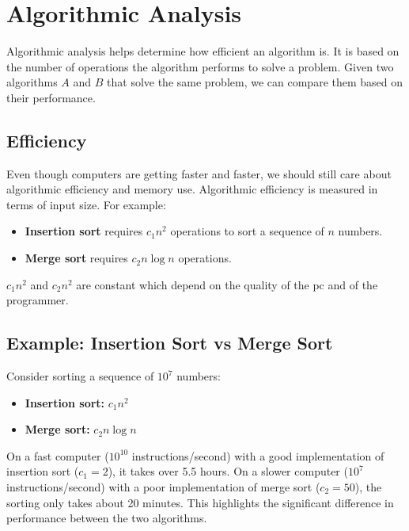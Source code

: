     \section{Algorithmic Analysis}
    Algorithmic analysis helps determine how efficient an algorithm is. It is based on the number of operations the algorithm performs to solve a problem. Given two algorithms \(A\) and \(B\) that solve the same problem, we can compare them based on their performance.
    
    \subsection{Efficiency}
    Even though computers are getting faster and faster, we should still care about algorithmic efficiency and memory use. Algorithmic efficiency is measured in terms of input size. For example:
    \begin{itemize}
        \item \textbf{Insertion sort} requires \(c_1 n^2\) operations to sort a sequence of \(n\) numbers.
        \item \textbf{Merge sort} requires \(c_2 n \log n\) operations.
    \end{itemize}
    \(c_1 n^2\) and \(c_2 n^2\) are constant which depend on the quality of the pc and of the programmer.
    \subsection{Example: Insertion Sort vs Merge Sort}
    Consider sorting a sequence of \(10^7\) numbers:
    \begin{itemize}
        \item \textbf{Insertion sort:} \(c_1 n^2\)
        \item \textbf{Merge sort:} \(c_2 n \log n\)
    \end{itemize}
    On a fast computer (\(10^{10}\) instructions/second) with a good implementation of insertion sort (\(c_1 = 2\)), it takes over 5.5 hours. On a slower computer (\(10^7\) instructions/second) with a poor implementation of merge sort (\(c_2 = 50\)), the sorting only takes about 20 minutes. This highlights the significant difference in performance between the two algorithms.